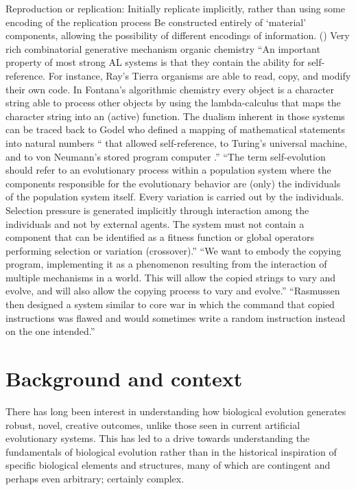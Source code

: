 Reproduction or replication:
Initially replicate implicitly, rather than using some encoding of the replication process  \parencite{Taylor2001}
Be constructed entirely of `material' components, allowing the possibility of different encodings of information. ()
Very rich combinatorial generative mechanism \eg organic chemistry \parencite{Vasas2015}
``An important property of most strong AL systems is that they contain the ability for self-reference. For instance, Ray's Tierra organisms are able to read, copy, and modify their own code. In Fontana's algorithmic chemistry every object is a character string able to process other objects by using the lambda-calculus that maps the character string into an (active) function. The dualism inherent in those systems can be traced back to Godel who defined a mapping of mathematical statements into natural numbers `` that allowed self-reference, to Turing's universal machine, and to von Neumann's stored program computer .''\parencite{Dittrich1998}
``The term self-evolution should refer to an evolutionary process within a population system where the components responsible for the evolutionary behavior are (only) the individuals of the population
system itself. Every variation is carried out by the individuals. Selection pressure is generated implicitly through interaction among the individuals and not by external agents. The system must not contain a component that can be identified as a fitness function or global operators performing selection or variation (\eg crossover).'' \cite{Dittrich1998}
``We want to embody the copying program, implementing it as a phenomenon resulting from the interaction of multiple mechanisms in a world. This will allow the copied strings to vary and evolve, and will also allow the copying process to vary and evolve.'' \cite{Nellis2014}
``Rasmussen then designed a system similar to core war in which the command that copied instructions was flawed and would sometimes write a random instruction instead on the one intended.'' \parencite{Ofria2004}



\section{Background and context}\label{background-and-context}

There has long been interest in understanding how biological evolution generates robust, novel, creative outcomes, unlike those seen in current artificial evolutionary systems. This has led to a drive towards understanding the fundamentals of biological evolution rather than in the historical inspiration of specific biological elements and structures, many of which are contingent and perhaps even arbitrary; certainly complex.
	
